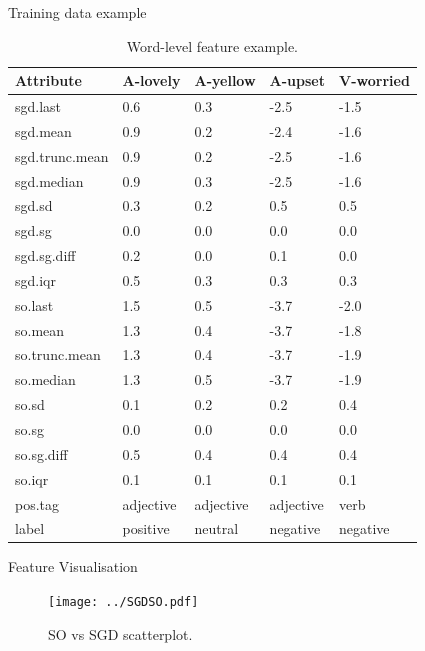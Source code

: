 \documentclass[handout]{beamer}
\begin{document}
\begin{frame}{Training data example}
\begin{scriptsize}
\begin{table}[htb]
\scriptsize
\centering
\begin{tabular}{l|llll}
  \hline
Attribute & A-lovely & A-yellow & A-upset & V-worried \\ 
  \hline
sgd.last &  0.6 &  0.3 & -2.5 & -1.5 \\ 
  sgd.mean &  0.9 &  0.2 & -2.4 & -1.6 \\ 
  sgd.trunc.mean &  0.9 &  0.2 & -2.5 & -1.6 \\ 
  sgd.median &  0.9 &  0.3 & -2.5 & -1.6 \\ 
  sgd.sd & 0.3 & 0.2 & 0.5 & 0.5 \\ 
  sgd.sg & 0.0 & 0.0 & 0.0 & 0.0 \\ 
  sgd.sg.diff & 0.2 & 0.0 & 0.1 & 0.0 \\ 
  sgd.iqr & 0.5 & 0.3 & 0.3 & 0.3 \\ 
  so.last &  1.5 &  0.5 & -3.7 & -2.0 \\ 
  so.mean &  1.3 &  0.4 & -3.7 & -1.8 \\ 
  so.trunc.mean &  1.3 &  0.4 & -3.7 & -1.9 \\ 
  so.median &  1.3 &  0.5 & -3.7 & -1.9 \\ 
  so.sd & 0.1 & 0.2 & 0.2 & 0.4 \\ 
  so.sg & 0.0 & 0.0 & 0.0& 0.0 \\ 
  so.sg.diff & 0.5 & 0.4 & 0.4 & 0.4 \\ 
  so.iqr & 0.1 & 0.1 & 0.1 & 0.1 \\ 
  pos.tag & adjective & adjective & adjective & verb \\ \hline
  label & positive & neutral & negative & negative \\ 
   \hline
\end{tabular}
\caption{Word-level feature example.}
\label{fig:featex}
\end{table}
\end{scriptsize}

\end{frame}


\begin{frame}{Feature Visualisation}
\begin{scriptsize}
\begin{figure}[htb]
	\centering
	 \texttt{[image: ../SGDSO.pdf]}
	\caption{SO vs SGD scatterplot.}
	\label{fig:sosgd}
\end{figure}
\end{scriptsize}

\end{frame}
\end{document}
